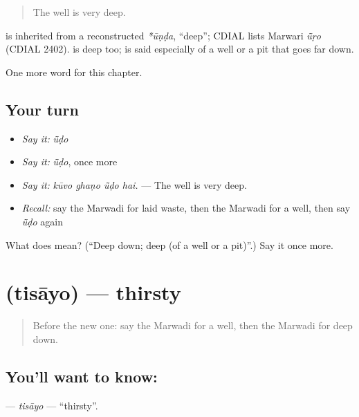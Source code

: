 \begin{quote}
The well is very deep.
\end{quote}

\begin{cousinweb}
is inherited from a reconstructed \emph{*ūṇḍa}, \textquotedblleft{}deep\textquotedblright{}; CDIAL lists Marwari \emph{ū̃ṛo} (CDIAL 2402). \textbf{} is deep too; \textbf{} is said especially of a well or a pit that goes far down.
\end{cousinweb}

\begin{grammarlens}[title={What you've built}]
One more word for this chapter.
\end{grammarlens}

\subsection*{Your turn}
\begin{itemize}
\raggedright
  \item \emph{Say it:} \emph{ū̃ḍo}
  \item \emph{Say it:} \emph{ū̃ḍo}, once more
  \item \emph{Say it:} \emph{kūvo ghaṇo ū̃ḍo hai.} — The well is very deep.
  \item \emph{Recall:} say the Marwadi for laid waste, then the Marwadi for a well, then say \emph{ū̃ḍo} again
\end{itemize}

\begin{tcolorbox}[breakable,colback=teal!4,colframe=teal!35!black,title={Before you move on}]
What does  mean? (\textquotedblleft{}Deep down; deep (of a well or a pit)\textquotedblright{}.) Say it once more.
\end{tcolorbox}
\section[\texorpdfstring{\mw{तिसायो} (tisāyo)}{तिसायो (tisāyo)}]{ (tisāyo) — thirsty}

\label{lesson:MW-C227-tisayo}



\begin{quote}
Before the new one: say the Marwadi for a well, then the Marwadi for deep down.
\end{quote}

\subsection*{You'll want to know: }
\textbf{} — \emph{tisāyo} — \textquotedblleft{}thirsty\textquotedblright{}.

